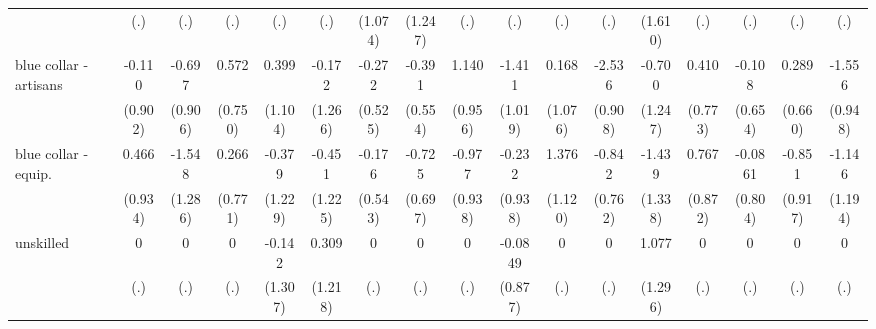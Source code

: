 {\begin{tabular}{l*{16}{c}}
                    &         (.)         &         (.)         &         (.)         &         (.)         &         (.)         &     (1.074)         &     (1.247)         &         (.)         &         (.)         &         (.)         &         (.)         &     (1.610)         &         (.)         &         (.)         &         (.)         &         (.)         \\
[1em]
blue collar - artisans&      -0.110         &      -0.697         &       0.572         &       0.399         &      -0.172         &      -0.272         &      -0.391         &       1.140         &      -1.411         &       0.168         &      -2.536\sym{**} &      -0.700         &       0.410         &      -0.108         &       0.289         &      -1.556         \\
                    &     (0.902)         &     (0.906)         &     (0.750)         &     (1.104)         &     (1.266)         &     (0.525)         &     (0.554)         &     (0.956)         &     (1.019)         &     (1.076)         &     (0.908)         &     (1.247)         &     (0.773)         &     (0.654)         &     (0.660)         &     (0.948)         \\
[1em]
blue collar - equip.&       0.466         &      -1.548         &       0.266         &      -0.379         &      -0.451         &      -0.176         &      -0.725         &      -0.977         &      -0.232         &       1.376         &      -0.842         &      -1.439         &       0.767         &     -0.0861         &      -0.851         &      -1.146         \\
                    &     (0.934)         &     (1.286)         &     (0.771)         &     (1.229)         &     (1.225)         &     (0.543)         &     (0.697)         &     (0.938)         &     (0.938)         &     (1.120)         &     (0.762)         &     (1.338)         &     (0.872)         &     (0.804)         &     (0.917)         &     (1.194)         \\
[1em]
unskilled           &           0         &           0         &           0         &      -0.142         &       0.309         &           0         &           0         &           0         &     -0.0849         &           0         &           0         &       1.077         &           0         &           0         &           0         &           0         \\
                    &         (.)         &         (.)         &         (.)         &     (1.307)         &     (1.218)         &         (.)         &         (.)         &         (.)         &     (0.877)         &         (.)         &         (.)         &     (1.296)         &         (.)         &         (.)         &         (.)         &         (.)         \\

\end{tabular}}
